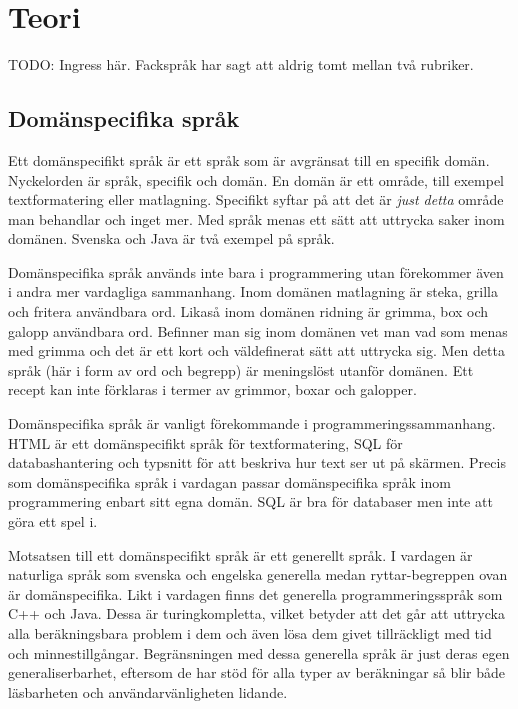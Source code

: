 
\chapter{Teori}

\begin{draft}

TODO: Ingress här. Fackspråk har sagt att aldrig tomt mellan två rubriker.

\section{Domänspecifika språk}

Ett domänspecifikt språk är ett språk som är avgränsat till en specifik domän. Nyckelorden är språk, specifik och domän. En domän är ett område, till exempel textformatering eller matlagning. Specifikt syftar på att det är \textit{just detta} område man behandlar och inget mer. Med språk menas ett sätt att uttrycka saker inom domänen. Svenska och Java är två exempel på språk.

Domänspecifika språk används inte bara i programmering utan förekommer även i andra mer vardagliga sammanhang. Inom domänen matlagning är steka, grilla och fritera användbara ord. Likaså inom domänen ridning är grimma, box och galopp användbara ord. Befinner man sig inom domänen vet man vad som menas med grimma och det är ett kort och väldefinerat sätt att uttrycka sig. Men detta språk (här i form av ord och begrepp) är meningslöst utanför domänen. Ett recept kan inte förklaras i termer av grimmor, boxar och galopper.

Domänspecifika språk är vanligt förekommande i programmeringssammanhang. HTML är ett domänspecifikt språk för textformatering, SQL för databashantering och typsnitt för att beskriva hur text ser ut på skärmen. Precis som domänspecifika språk i vardagan passar domänspecifika språk inom programmering enbart sitt egna domän. SQL är bra för databaser men inte att göra ett spel i.

Motsatsen till ett domänspecifikt språk är ett generellt språk. I vardagen är naturliga språk som svenska och engelska generella medan ryttar-begreppen ovan är domänspecifika. Likt i vardagen finns det generella programmeringsspråk som C++ och Java. Dessa är turingkompletta, vilket betyder att det går att uttrycka alla beräkningsbara problem i dem och även lösa dem givet tillräckligt med tid och minnestillgångar.\cite{turing_ne} \cite{turing_book} Begränsningen med dessa generella språk är just deras egen generaliserbarhet, eftersom de har stöd för alla typer av beräkningar så blir både läsbarheten och användarvänligheten lidande.


\end{draft}
